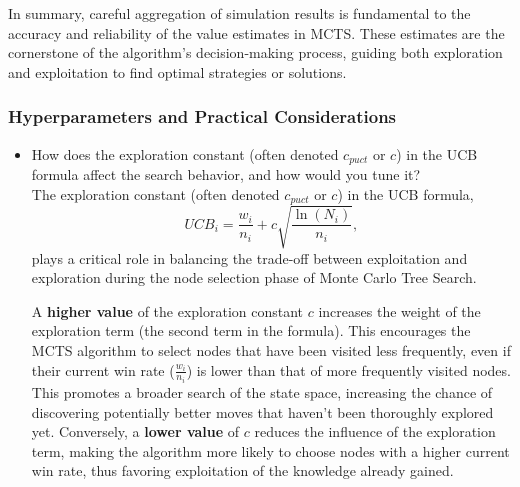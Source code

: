 \begin{itemize}
In summary, careful aggregation of simulation results is fundamental to the accuracy and reliability of the value estimates in MCTS. These estimates are the cornerstone of the algorithm's decision-making process, guiding both exploration and exploitation to find optimal strategies or solutions.
    
\end{itemize}


\subsubsection{Hyperparameters and Practical Considerations}
\begin{itemize}
    \item How does the exploration constant (often denoted \( c_{puct} \) or \( c \)) in the UCB formula affect the search behavior, and how would you tune it?  \\
    The exploration constant (often denoted \( c_{puct} \) or \( c \)) in the UCB formula,
$$UCB_i = \frac{w_i}{n_i} + c \sqrt{\frac{\ln(N_i)}{n_i}},$$
plays a critical role in balancing the trade-off between exploitation and exploration during the node selection phase of Monte Carlo Tree Search.

A \textbf{higher value} of the exploration constant \( c \) increases the weight of the exploration term (the second term in the formula). This encourages the MCTS algorithm to select nodes that have been visited less frequently, even if their current win rate (\( \frac{w_i}{n_i} \)) is lower than that of more frequently visited nodes. This promotes a broader search of the state space, increasing the chance of discovering potentially better moves that haven't been thoroughly explored yet. Conversely, a \textbf{lower value} of \( c \) reduces the influence of the exploration term, making the algorithm more likely to choose nodes with a higher current win rate, thus favoring exploitation of the knowledge already gained.


\end{itemize}
